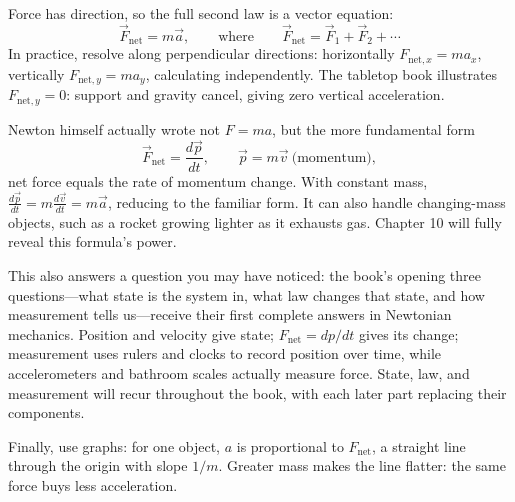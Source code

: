 \begin{mathbridge}
Force has direction, so the full second law is a vector equation:
\[
  \vec{F}_{\text{net}} = m\vec{a},
  \qquad\text{where}\qquad
  \vec{F}_{\text{net}} = \vec{F}_1 + \vec{F}_2 + \cdots
\]
In practice, resolve along perpendicular directions: horizontally \(F_{\text{net},x}=ma_x\), vertically \(F_{\text{net},y}=ma_y\), calculating independently. The tabletop book illustrates \(F_{\text{net},y}=0\): support and gravity cancel, giving zero vertical acceleration.

Newton himself actually wrote not \(F=ma\), but the more fundamental form
\[
  \vec{F}_{\text{net}} = \frac{d\vec{p}}{dt},
  \qquad \vec{p}=m\vec{v}\ \text{(momentum)},
\]
net force equals the rate of momentum change. With constant mass, \(\frac{d\vec{p}}{dt}=m\frac{d\vec{v}}{dt}=m\vec{a}\), reducing to the familiar form. It can also handle changing-mass objects, such as a rocket growing lighter as it exhausts gas. Chapter 10 will fully reveal this formula's power.

This also answers a question you may have noticed: the book's opening three questions---what state is the system in, what law changes that state, and how measurement tells us---receive their first complete answers in Newtonian mechanics. Position and velocity give state; \(F_{\text{net}}=dp/dt\) gives its change; measurement uses rulers and clocks to record position over time, while accelerometers and bathroom scales actually measure force. State, law, and measurement will recur throughout the book, with each later part replacing their components.

Finally, use graphs: for one object, \(a\) is proportional to \(F_{\text{net}}\), a straight line through the origin with slope \(1/m\). Greater mass makes the line flatter: the same force buys less acceleration.
\end{mathbridge}

\begin{center}
\end{center}

